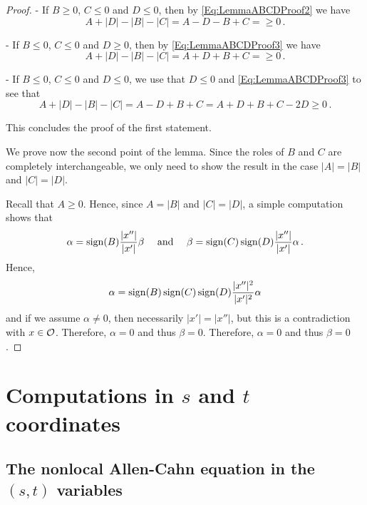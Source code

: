 \begin{proof}
- If $B \geq 0$, $C \leq 0$ and $D \leq 0$, then by \eqref{Eq:LemmaABCDProof2} we have
$$
A + |D| - |B| - |C| = A - D - B + C = \geq 0\,.
$$

- If $B \leq 0$, $C \leq 0$ and $D \geq 0$, then by \eqref{Eq:LemmaABCDProof3} we have
$$
A + |D| - |B| - |C| = A + D + B + C = \geq 0\,.
$$

- If $B \leq 0$, $C \leq 0$ and $D \leq 0$, we use that $D\leq 0$ and \eqref{Eq:LemmaABCDProof3} to see that
$$
A + |D| - |B| - |C| = A - D + B + C =  A + D + B + C -2D \geq 0\,.
$$

This concludes the proof of the first statement.

We prove now the second point of the lemma. Since the roles of $B$ and $C$ are completely interchangeable, we only need to show the result in the case
$|A| = |B|$ and $|C| = |D|$.

Recall that $A \geq 0$. Hence, since $A = |B|$ and $|C| = |D|$, a simple computation shows that
$$
\alpha = \operatorname{sign} (B) \dfrac{|x''|}{|x'|}\beta \quad \textrm{ and } \quad
\beta = \operatorname{sign} (C) \operatorname{sign}(D) \dfrac{|x''|}{|x'|} \alpha \,.
$$
Hence,
$$
\alpha = \operatorname{sign} (B) \operatorname{sign} (C) \operatorname{sign}(D) \dfrac{|x''|^2}{|x'|^2} \alpha
$$
and if we assume $\alpha \neq 0$, then necessarily $|x'| = |x''|$, but this is a contradiction with $x\in \mathcal{O}$. Therefore, $\alpha = 0$ and thus $\beta = 0$. Therefore, $\alpha = 0$ and thus $\beta = 0$.
\end{proof}








\section{Computations in $s$ and $t$ coordinates}
\label{Sec:stcomputations}


\subsection{The nonlocal Allen-Cahn equation in the $(s,t)$ variables}

